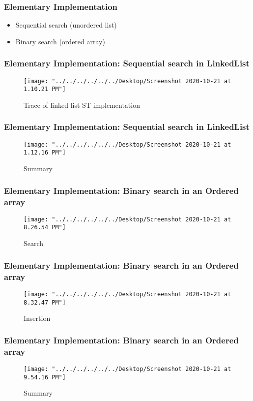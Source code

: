 \documentclass[11pt]{beamer}
\begin{document}
\begin{frame}
	\frametitle{Elementary Implementation}
	\begin{itemize}
		\item Sequential search (unordered list)
		\item Binary search (ordered array)
	\end{itemize}
\end{frame}

\begin{frame}
	\frametitle{Elementary Implementation: Sequential search in LinkedList }
	\begin{figure}
		\centering
		\texttt{[image: "../../../../../../Desktop/Screenshot 2020-10-21 at 1.10.21 PM"]}
		\caption{Trace of linked-list ST implementation}
		\label{fig:screenshot-2020-10-21-at-1}
	\end{figure}	
\end{frame}

\begin{frame}
	\frametitle{Elementary Implementation: Sequential search in LinkedList }
    \begin{figure}
    	\centering
    	\texttt{[image: "../../../../../../Desktop/Screenshot 2020-10-21 at 1.12.16 PM"]}
    	\caption{Summary}
    	\label{fig:screenshot-2020-10-21-at-1}
    \end{figure}
\end{frame}

\begin{frame}
	\frametitle{Elementary Implementation: Binary search in an Ordered array}
   \begin{figure}
   	\centering
   	\texttt{[image: "../../../../../../Desktop/Screenshot 2020-10-21 at 8.26.54 PM"]}
   	\caption{Search}
   	\label{fig:screenshot-2020-10-21-at-8}
   \end{figure} 
\end{frame}

\begin{frame}
	\frametitle{Elementary Implementation: Binary search in an Ordered array}
   \begin{figure}
   	\centering
   	\texttt{[image: "../../../../../../Desktop/Screenshot 2020-10-21 at 8.32.47 PM"]}
   	\caption{Insertion}
   	\label{fig:screenshot-2020-10-21-at-8}
   \end{figure} 
\end{frame}

\begin{frame}
	\frametitle{Elementary Implementation: Binary search in an Ordered array}
	\begin{figure}
		\centering
		\texttt{[image: "../../../../../../Desktop/Screenshot 2020-10-21 at 9.54.16 PM"]}
		\caption{Summary}
		\label{fig:screenshot-2020-10-21-at-9}
	\end{figure}	
\end{frame}
\end{document}
